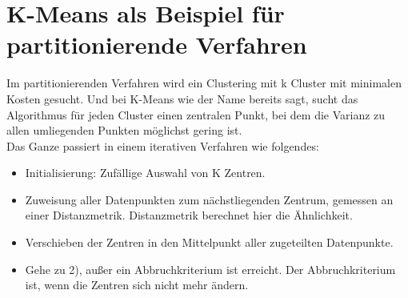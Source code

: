 \documentclass[runningheads]{llncs}
\begin{document}
\section{K-Means als Beispiel für partitionierende Verfahren}
Im partitionierenden Verfahren wird ein Clustering mit k Cluster mit minimalen Kosten gesucht. Und bei K-Means wie der Name bereits sagt, sucht das Algorithmus für jeden Cluster einen zentralen Punkt, bei dem die Varianz zu allen umliegenden Punkten möglichst gering ist.\\[4pt]
Das Ganze passiert in einem iterativen Verfahren wie folgendes:
\begin{itemize}
	\item Initialisierung: Zufällige Auswahl von K Zentren. 
	\item Zuweisung aller Datenpunkten zum nächstliegenden Zentrum, gemessen an einer Distanzmetrik. Distanzmetrik berechnet hier die Ähnlichkeit. 
	\item Verschieben der Zentren in den Mittelpunkt aller zugeteilten Datenpunkte.
	\item Gehe zu 2), außer ein Abbruchkriterium ist erreicht. Der Abbruchkriterium ist, wenn die Zentren sich nicht mehr ändern.    
\end{itemize}
\end{document}
